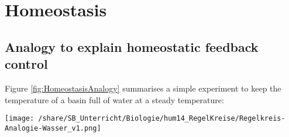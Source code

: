 \section{Homeostasis}\label{sec:HomeostaticControl}
		\begin{center}
		\end{center}

\subsection{Analogy to explain homeostatic feedback control}		
Figure \ref{fig:HomeostasisAnalogy} summarises a simple experiment to keep the temperature of a basin full of water at a steady temperature:
\vspace{1cm}


		
		\begin{figure*}[htp]
		  \texttt{[image: /share/SB\_Unterricht/Biologie/hum14\_RegelKreise/Regelkreis-Analogie-Wasser\_v1.png]}
		  \caption[Homeostasis model analogy with cold and warm water; unknown source, adapted by saz]{Analogy model to explain homeostatic control}
		  \label{fig:HomeostasisAnalogy}
		\end{figure*}
\clearpage


